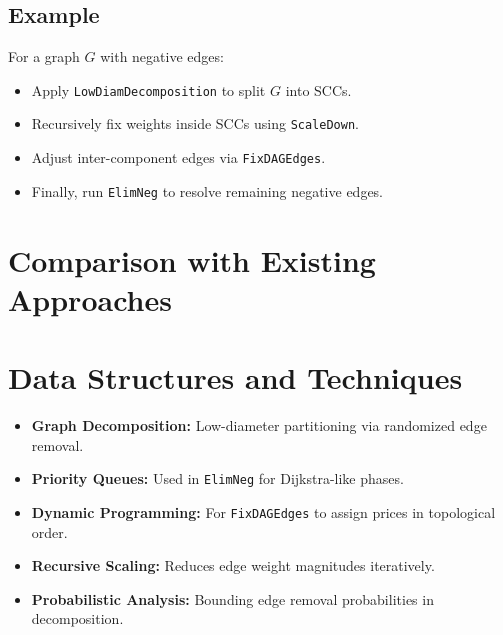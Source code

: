 \documentclass{article}
\begin{document}
\subsection{Example}
For a graph \( G \) with negative edges:
\begin{itemize}
    \item Apply \texttt{LowDiamDecomposition} to split \( G \) into SCCs.
    \item Recursively fix weights inside SCCs using \texttt{ScaleDown}.
    \item Adjust inter-component edges via \texttt{FixDAGEdges}.
    \item Finally, run \texttt{ElimNeg} to resolve remaining negative edges.
\end{itemize}

\section{Comparison with Existing Approaches}

\begin{table}[h!]
    \centering
    \caption{Comparison of approaches for negative-weight SSSP.}
\end{table}
\section{Data Structures and Techniques}

\begin{itemize}
    \item \textbf{Graph Decomposition:} Low-diameter partitioning via randomized edge removal.
    \item \textbf{Priority Queues:} Used in \texttt{ElimNeg} for Dijkstra-like phases.
    \item \textbf{Dynamic Programming:} For \texttt{FixDAGEdges} to assign prices in topological order.
    \item \textbf{Recursive Scaling:} Reduces edge weight magnitudes iteratively.
    \item \textbf{Probabilistic Analysis:} Bounding edge removal probabilities in decomposition.
\end{itemize}
\end{document}
